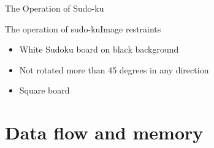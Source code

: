 \documentclass[10pt]{beamer}
\begin{document}
\begin{frame}{The Operation of Sudo-ku}
\end{frame}


\begin{frame}{The operation of sudo-ku}{Image restraints}
\begin{itemize}
\item White Sudoku board on black background
\item Not rotated more than 45 degrees in any direction
\item Square board
\end{itemize}
\end{frame}


\section{Data flow and memory}
\end{document}
